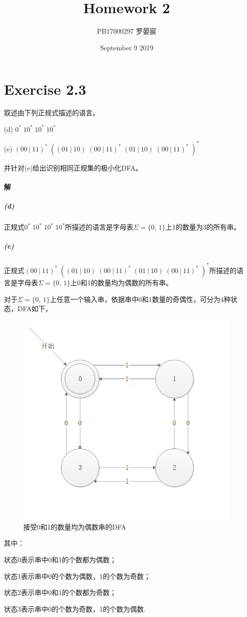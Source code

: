 \documentclass{article}
\title{Homework 2}
\author{PB17000297 罗晏宸}
\date{September 9 2019}
\begin{document}
\maketitle

\section{Exercise 2.3}
叙述由下列正规式描述的语言。\par
(d) $0^*\;10^*\;10^*\;10^*$\par
(e) $(00\ |\ 11)^*\;((01\ |\ 10)\;(00\ |\ 11)^*\;(01\ |\ 10)\;(00\ |\ 11)^*\;)^*$\par
并针对(e)给出识别相同正规集的极小化DFA。
\\

\paragraph{解}
\subparagraph{(d)}
正规式$0^*\;10^*\;10^*\;10^*$所描述的语言是字母表$\Sigma=\{0,\,1\}$上1的数量为3的所有串。
\subparagraph{(e)}
正规式$(00\ |\ 11)^*\;((01\ |\ 10)\;(00\ |\ 11)^*\;(01\ |\ 10)\;(00\ |\ 11)^*\;)^*$所描述的语言是字母表$\Sigma=\{0,\,1\}$上0和1的数量均为偶数的所有串。\par
对于$\Sigma=\{0,\,1\}$上任意一个输入串，依据串中0和1数量的奇偶性，可分为4种状态，DFA如下，
\begin{figure}
\centering
\includegraphics[scale=1]{DFA1.png}
\caption{接受0和1的数量均为偶数串的DFA}
\label{fig:1}
\end{figure}
其中：\par
状态0表示串中0和1的个数都为偶数；\par
状态1表示串中0的个数为偶数，1的个数为奇数；\par
状态2表示串中0和1的个数都为奇数；\par
状态3表示串中0的个数为奇数，1的个数为偶数.
\\
\end{document}
